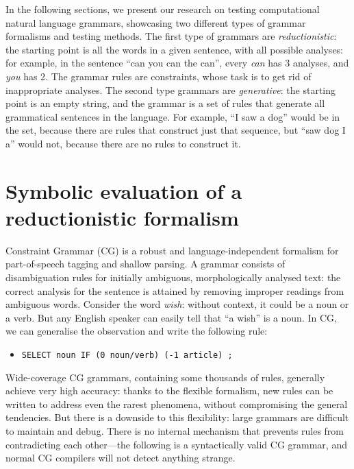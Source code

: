 In the following sections, we present our research on testing computational natural language grammars, showcasing two different types of grammar formalisms and testing methods.
The first type of grammars are \emph{reductionistic}: the starting point is all the words in a given sentence, with all possible analyses: for example, in the sentence ``can you can the can'', every \emph{can} has 3 analyses, and \emph{you} has 2. The grammar rules are constraints, whose task is to get rid of inappropriate analyses.
The second type grammars are \emph{generative}: the starting point is an empty string, and the grammar is a set of rules that generate all grammatical sentences in the language. For example, ``I saw a dog'' would be in the set, because there are rules that construct just that sequence, but ``saw dog I a'' would not, because there are no rules to construct it.



\section{Symbolic evaluation of a reductionistic formalism}

Constraint Grammar (CG) \cite{karlsson1995constraint} is a robust and
language-independent formalism for part-of-speech tagging and shallow
parsing. A grammar consists of disambiguation rules for initially
ambiguous, morphologically analysed text: the correct analysis for the
sentence is attained by removing improper readings from ambiguous
words. Consider the word \emph{wish}: without context, it could be a
noun or a verb. But any English speaker can easily tell that ``a
wish'' is a noun. In CG, we can generalise the observation and write
the following rule:

\begin{itemize}
\item[] \texttt{SELECT noun IF (0 noun/verb) (-1 article) ;}
\end{itemize}

Wide-coverage CG grammars, containing some thousands of rules,
generally achieve very high accuracy:
thanks to the flexible formalism, new rules can be written
to address even the rarest phenomena, without compromising the general tendencies.
But there is a downside to this flexibility: large grammars are difficult to maintain
and debug. There is no internal mechanism that prevents rules from contradicting
each other---the following is a syntactically valid CG grammar, and normal CG compilers will not detect anything strange.

